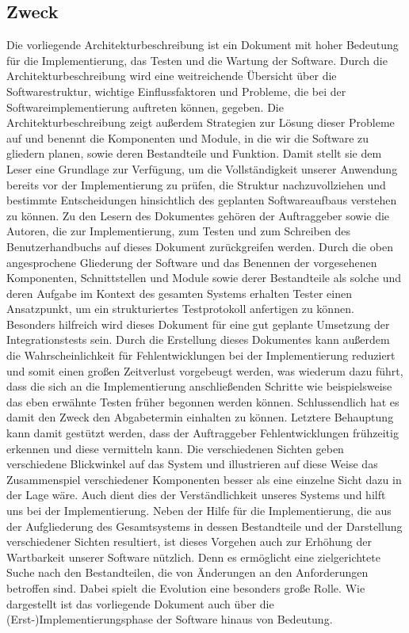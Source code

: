 \documentclass[enabledeprecatedfontcommands,fontsize=11pt,paper=a4,twoside]{scrartcl}
\newcounter{one}
\begin{document}
	\subsection{Zweck}
	Die vorliegende Architekturbeschreibung ist ein Dokument mit hoher Bedeutung für die Implementierung, das Testen und die Wartung der Software. Durch die Architekturbeschreibung wird eine weitreichende Übersicht über die Softwarestruktur, wichtige Einflussfaktoren und Probleme, die bei der Softwareimplementierung auftreten können, gegeben. Die Architekturbeschreibung zeigt außerdem Strategien zur Lösung dieser Probleme auf und benennt die Komponenten und Module, in die wir die Software zu gliedern planen, sowie deren Bestandteile und Funktion. Damit stellt sie dem Leser eine Grundlage zur Verfügung, um die Vollständigkeit unserer Anwendung bereits vor der Implementierung zu prüfen, die Struktur nachzuvollziehen und bestimmte Entscheidungen hinsichtlich des geplanten Softwareaufbaus verstehen zu können. Zu den Lesern des Dokumentes gehören der Auftraggeber sowie die Autoren, die zur Implementierung, zum Testen und zum Schreiben des Benutzerhandbuchs auf dieses Dokument zurückgreifen werden. Durch die oben angesprochene Gliederung der Software und das Benennen der vorgesehenen Komponenten, Schnittstellen und Module sowie derer Bestandteile als solche und deren Aufgabe im Kontext des gesamten Systems erhalten Tester einen Ansatzpunkt, um ein strukturiertes Testprotokoll anfertigen zu können. Besonders hilfreich wird dieses Dokument für eine gut geplante Umsetzung der Integrationstests sein. Durch die Erstellung dieses Dokumentes kann außerdem die Wahrscheinlichkeit für Fehlentwicklungen bei der Implementierung reduziert und somit einen großen Zeitverlust vorgebeugt werden, was wiederum dazu führt, dass die sich an die Implementierung anschließenden Schritte wie beispielsweise das eben erwähnte Testen früher begonnen werden können. Schlussendlich hat es damit den Zweck den Abgabetermin einhalten zu können. Letztere Behauptung kann damit gestützt werden,  dass der Auftraggeber Fehlentwicklungen frühzeitig erkennen und diese vermitteln kann. Die verschiedenen Sichten geben verschiedene Blickwinkel auf das System und illustrieren auf diese Weise das Zusammenspiel verschiedener Komponenten besser als eine einzelne Sicht dazu in der Lage wäre. Auch dient dies der Verständlichkeit unseres Systems und hilft uns bei der Implementierung. Neben der Hilfe für die Implementierung, die aus der Aufgliederung des Gesamtsystems in dessen Bestandteile und der Darstellung verschiedener Sichten resultiert, ist dieses Vorgehen auch zur Erhöhung der Wartbarkeit unserer Software nützlich. Denn es ermöglicht eine zielgerichtete Suche nach den Bestandteilen, die von Änderungen an den Anforderungen betroffen sind. Dabei spielt die Evolution eine besonders große Rolle. Wie dargestellt ist das vorliegende Dokument auch über die (Erst-)Implementierungsphase der Software hinaus von Bedeutung.
	\newpage
\end{document}
